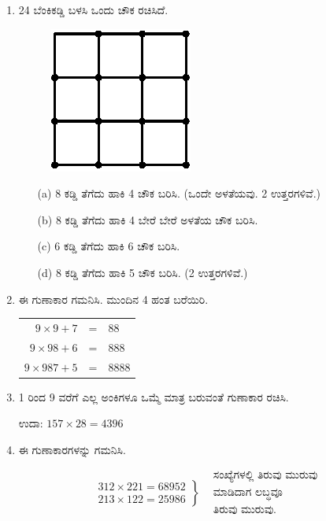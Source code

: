 \begin{enumerate}
\item 24 ಬೆಂಕಿಕಡ್ಡಿ ಬಳಸಿ ಒಂದು ಚೌಕ ರಚಿಸಿದೆ. 
\begin{figure}[H]
\centering
\includegraphics[scale=1.1]{images/chap11/q8.eps}
\end{figure}

\begin{itemize}
\item[(a)] 8 ಕಡ್ಡಿ ತೆಗೆದು ಹಾಕಿ 4 ಚೌಕ ಬರಿಸಿ. (ಒಂದೇ ಅಳತೆಯವು. 2 ಉತ್ತರಗಳಿವೆ.)
\item[(b)] 8 ಕಡ್ಡಿ ತೆಗೆದು ಹಾಕಿ 4 ಬೇರೆ ಬೇರೆ ಅಳತೆಯ ಚೌಕ ಬರಿಸಿ. 
\item[(c)] 6 ಕಡ್ಡಿ ತೆಗೆದು ಹಾಕಿ 6 ಚೌಕ ಬರಿಸಿ. 
\item[(d)] 8 ಕಡ್ಡಿ ತೆಗೆದು ಹಾಕಿ 5 ಚೌಕ ಬರಿಸಿ. (2 ಉತ್ತರಗಳಿವೆ.)
\end{itemize}

\item ಈ ಗುಣಾಕಾರ ಗಮನಿಸಿ. ಮುಂದಿನ 4 ಹಂತ ಬರೆಯಿರಿ. 

\begin{tabular}[t]{r@{\;}c@{\;}l}
$9\times 9 + 7$ & = & $88$\\
$9\times 98 + 6$ & = & $888$\\
$9\times 987 + 5$ & = & $8888$
\end{tabular}

\item 1 ರಿಂದ 9 ವರೆಗೆ ಎಲ್ಲ ಅಂಕಿಗಳೂ ಒಮ್ಮೆ ಮಾತ್ರ ಬರುವಂತೆ ಗುಣಾಕಾರ ರಚಿಸಿ. 

ಉದಾ: $157\times 28 = 4396$

\item ಈ ಗುಣಾಕಾರಗಳನ್ನು ಗಮನಿಸಿ. 

\begin{equation*}
\left.
\begin{aligned}
312\times 221 = 68952\\
213\times 122 = 25986  
\end{aligned}
\right\}
\begin{aligned}
& \text{ಸಂಖ್ಯೆಗಳಲ್ಲಿ ತಿರುವು ಮುರುವು}\\[-4.5pt]
& \text{ಮಾಡಿದಾಗ ಲಬ್ಧವೂ}\\[-4.5pt]
& \text{ತಿರುವು ಮುರುವು.}
\end{aligned}
\end{equation*}


\end{enumerate}
